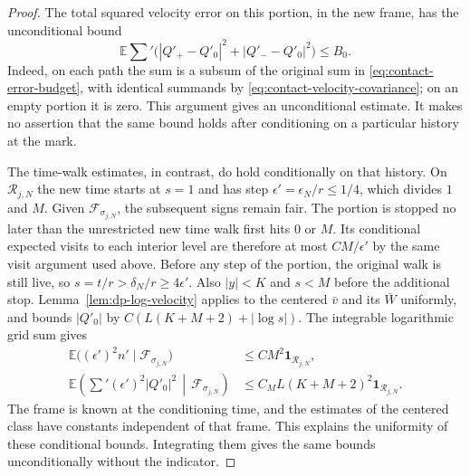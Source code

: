 \documentclass[11pt]{article}
\numberwithin{equation}{section}
\theoremstyle{definition}
\theoremstyle{remark}
\begin{document}
\begin{proof}
The total squared velocity error on this portion, in the new frame, has the
unconditional bound
\begin{equation}\label{eq:contact-frame-error-budget}
  \mathbb E\sum'
       \bigl(|Q'_+-Q'_0|^2+|Q'_--Q'_0|^2\bigr)\le B_0.
\end{equation}
Indeed, on each path the sum is a subsum of the original sum in
\eqref{eq:contact-error-budget}, with identical summands by
\eqref{eq:contact-velocity-covariance}; on an empty portion it is zero.
This argument gives an unconditional estimate.  It makes no assertion that
the same bound holds after conditioning on a particular history at the
mark.

The time-walk estimates, in contrast, do hold conditionally on that history.
On $\mathcal R_{j,N}$ the new time starts at $s=1$ and has step
$\epsilon'=\epsilon_N/r\le1/4$, which divides $1$ and $M$.  Given
$\mathcal F_{\sigma_{j,N}}$, the subsequent signs remain fair.  The portion
is stopped no later than the unrestricted new time walk first hits $0$ or
$M$.  Its conditional expected visits to each interior level are therefore
at most $CM/\epsilon'$ by the same visit argument used above.  Before any
step of the portion, the original walk is still live, so
$s=t/r>\delta_N/r\ge4\epsilon'$.  Also $|y|<K$ and $s<M$ before the
additional stop.  Lemma~\ref{lem:dp-log-velocity} applies to the centered
$\bar v$ and its $\bar W$ uniformly, and bounds $|Q'_0|$ by
$C(L(K+M+2)+|\log s|)$.  The integrable logarithmic grid sum gives
\begin{equation}\label{eq:contact-frame-time-budget}
\begin{split}
  \mathbb E\bigl((\epsilon')^2n'\mid\mathcal F_{\sigma_{j,N}}\bigr)
       &\le CM^2\mathbf1_{\mathcal R_{j,N}},\\
  \mathbb E\left(\sum'
          (\epsilon')^2|Q'_0|^2\,\middle|\,\mathcal F_{\sigma_{j,N}}\right)
       &\le C_M L(K+M+2)^2\mathbf1_{\mathcal R_{j,N}}.
\end{split}
\end{equation}
The frame is known at the conditioning time, and the estimates of the
centered class have constants independent of that frame.  This explains the
uniformity of these conditional bounds.  Integrating them gives the same
bounds unconditionally without the indicator.


\end{proof}
\end{document}
